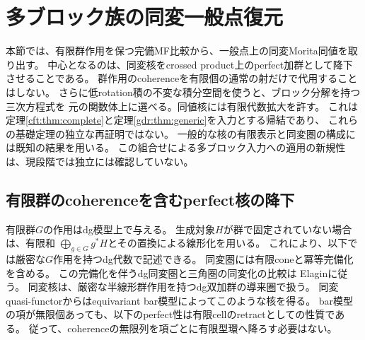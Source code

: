 \section{多ブロック族の同変一般点復元}
\label{med:sec:descent}

本節では、有限群作用を保つ完備MF比較から、一般点上の同変Morita同値を取り出す。
中心となるのは、同変核をcrossed product上のperfect加群として降下させることである。
群作用のcoherenceを有限個の通常の射だけで代用することはしない。
さらに低rotation積の不変な積分空間を使うと、ブロック分解を持つ三次方程式を
元の関数体上に選べる。同値核には有限代数拡大を許す。
これは定理\ref{cft:thm:complete}と定理\ref{gdr:thm:generic}を入力とする帰結であり、
これらの基礎定理の独立な再証明ではない。
一般的な核の有限表示と同変圏の構成には既知の結果を用いる。
この組合せによる多ブロック入力への適用の新規性は、現段階では独立には確認していない。

\subsection{有限群のcoherenceを含むperfect核の降下}

有限群$G$の作用はdg模型上で与える。
生成対象$H$が群で固定されていない場合は、有限和
$\bigoplus_{g\in G}g^*H$とその置換による線形化を用いる。
これにより、以下では厳密な$G$作用を持つdg代数で記述できる。
同変圏には有限coneと冪等完備化を含める。
この完備化を伴うdg同変圏と三角圏の同変化の比較は
Elagin\cite[Lemma~8.6, Theorems~8.7, 8.9]{MEDElagin}に従う。
同変核は、厳密な半線形群作用を持つdg双加群の導来圏で扱う。
同変quasi-functorからはequivariant bar模型によってこのような核を得る。
bar模型の項が無限個あっても、以下のperfect性は有限cellのretractとしての性質である。
従って、coherenceの無限列を項ごとに有限型環へ降ろす必要はない。

